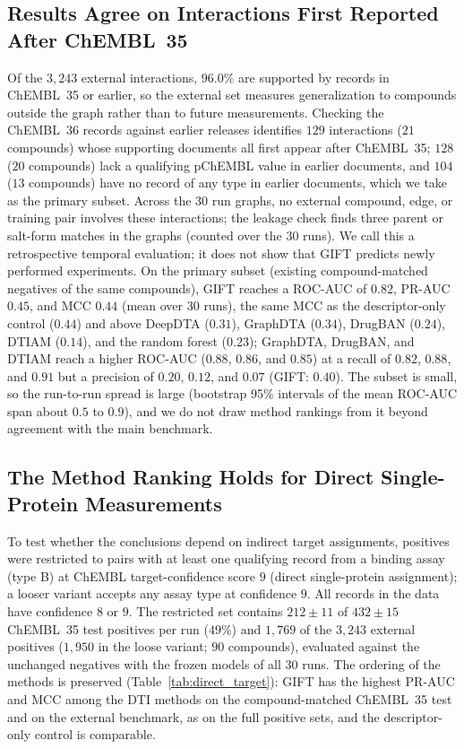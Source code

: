 \documentclass[11pt,letterpaper]{article}
\begin{document}
\subsection{Results Agree on Interactions First Reported After ChEMBL~35}
\label{sec:temporal}
Of the $3{,}243$ external interactions, $96.0\%$ are supported by records in ChEMBL~35 or earlier, so the external set measures generalization to compounds outside the graph rather than to future measurements. Checking the ChEMBL~36 records against earlier releases identifies $129$ interactions ($21$ compounds) whose supporting documents all first appear after ChEMBL~35; $128$ ($20$ compounds) lack a qualifying pChEMBL value in earlier documents, and $104$ ($13$ compounds) have no record of any type in earlier documents, which we take as the primary subset. Across the 30 run graphs, no external compound, edge, or training pair involves these interactions; the leakage check finds three parent or salt-form matches in the graphs (counted over the 30 runs). We call this a retrospective temporal evaluation; it does not show that GIFT predicts newly performed experiments. On the primary subset (existing compound-matched negatives of the same compounds), GIFT reaches a ROC-AUC of $0.82$, PR-AUC $0.45$, and MCC $0.44$ (mean over 30 runs), the same MCC as the descriptor-only control ($0.44$) and above DeepDTA ($0.31$), GraphDTA ($0.34$), DrugBAN ($0.24$), DTIAM ($0.14$), and the random forest ($0.23$); GraphDTA, DrugBAN, and DTIAM reach a higher ROC-AUC ($0.88$, $0.86$, and $0.85$) at a recall of $0.82$, $0.88$, and $0.91$ but a precision of $0.20$, $0.12$, and $0.07$ (GIFT: $0.40$). The subset is small, so the run-to-run spread is large (bootstrap 95\% intervals of the mean ROC-AUC span about $0.5$ to $0.9$), and we do not draw method rankings from it beyond agreement with the main benchmark.

\subsection{The Method Ranking Holds for Direct Single-Protein Measurements}
\label{sec:direct_target}
To test whether the conclusions depend on indirect target assignments, positives were restricted to pairs with at least one qualifying record from a binding assay (type B) at ChEMBL target-confidence score $9$ (direct single-protein assignment); a looser variant accepts any assay type at confidence $9$. All records in the data have confidence $8$ or $9$. The restricted set contains $212\pm11$ of $432\pm15$ ChEMBL~35 test positives per run ($49\%$) and $1{,}769$ of the $3{,}243$ external positives ($1{,}950$ in the loose variant; $90$ compounds), evaluated against the unchanged negatives with the frozen models of all 30 runs. The ordering of the methods is preserved (Table~\ref{tab:direct_target}): GIFT has the highest PR-AUC and MCC among the DTI methods on the compound-matched ChEMBL~35 test and on the external benchmark, as on the full positive sets, and the descriptor-only control is comparable.
\end{document}
